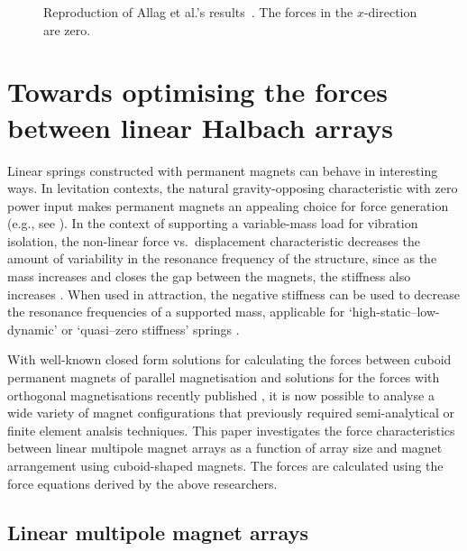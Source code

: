 \documentclass[11pt,a4paper]{memoir}
\begin{document}
\begin{figure}
\centering
{}
\caption{Reproduction of Allag et al.'s results~\textcite{allag2009-electromotion}. The forces in the $x$-direction are zero.}
\end{figure}





\section{Towards optimising the forces between linear Halbach arrays}

Linear springs constructed with permanent magnets can behave in interesting ways. In levitation contexts, the natural gravity-opposing characteristic with zero power input makes permanent magnets an appealing choice for force generation (e.g., see \cite{iniguez2010-jmmm}). In the context of supporting a variable-mass load for vibration isolation, the non-linear force vs.\ displacement characteristic decreases the amount of variability in the resonance frequency of the structure, since as the mass increases and closes the gap between the magnets, the stiffness also increases \parencite{bonisoli2007-mrc}. When used in attraction, the negative stiffness can be used to decrease the resonance frequencies of a supported mass, applicable for `high-static--low-dynamic' or `quasi--zero stiffness' springs \parencite{carrella2008-jsv,robertson2009-jsv}.

With well-known closed form solutions for calculating the forces between cuboid permanent magnets of parallel magnetisation \parencite{akoun1984} and solutions for the forces with orthogonal magnetisations recently published \parencite{janssen2009-sensorletters,allag2009-sensorletters}, it is now possible to analyse a wide variety of magnet configurations that previously required semi-analytical or finite element analsis techniques. This paper investigates the force characteristics between linear multipole magnet arrays as a function of array size and magnet arrangement using cuboid-shaped magnets. The forces are calculated using the force equations derived by the above researchers.


\subsection{Linear multipole magnet arrays}
\end{document}
